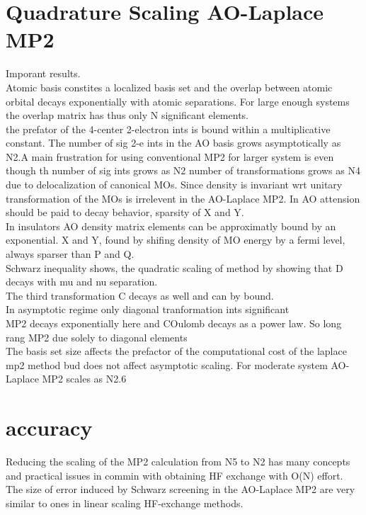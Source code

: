 \documentclass[10pt, draft]{article}
\begin{document}
\section{Quadrature Scaling AO-Laplace MP2}
Imporant results. \\
Atomic basis constites a localized basis set and the overlap between atomic orbital decays exponentially with atomic separations. For large enough systems the overlap matrix has thus only N significant elements. \\
the prefator of the 4-center 2-electron ints is bound within a multiplicative constant.  The number of sig 2-e ints in the AO basis grows asymptotically as N2.\linebreak[1]
A main frustration for using conventional MP2 for larger system is even though th number of sig ints grows as N2 number of transformations grows as N4 due to delocalization of canonical MOs. Since density is invariant wrt unitary transformation of the MOs is irrelevent in the AO-Laplace MP2.  In AO attension should be paid to decay behavior, sparsity of X and Y. \\
In insulators AO density matrix elements can be approximatly bound by an exponential.  X and Y, found by shifing density of MO energy by a fermi level, always sparser than P and Q.\\
Schwarz inequality shows, the quadratic scaling of method by showing that D decays with mu and nu separation.\\The third transformation C decays as well and can by bound.  \\
In asymptotic regime only diagonal tranformation ints significant\\
MP2 decays exponentially here and COulomb decays as a power law.  So long rang MP2  due solely to diagonal elements\\
The basis set size affects the prefactor of the computational cost of the laplace mp2 method bud does not affect asymptotic scaling.  For moderate system AO-Laplace MP2 scales as  N2.6\\
\section{accuracy} 
Reducing the scaling of the MP2 calculation from N5 to N2 has many concepts and practical issues in commin with obtaining HF exchange with O(N) effort.  The size of error induced by Schwarz screening in the AO-Laplace MP2 are very similar to ones in linear scaling HF-exchange methods.
\end{document}
